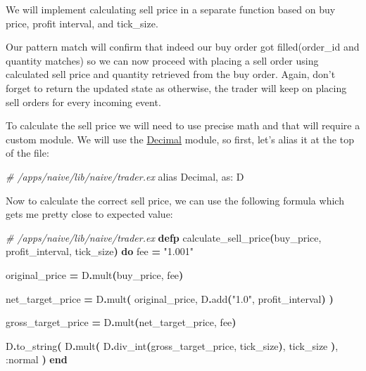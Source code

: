 \documentclass[
  oneside]{book}
\newenvironment{Shaded}{\begin{snugshade}}{\end{snugshade}}
\newcommand{\CommentTok}[1]{\textcolor[rgb]{0.56,0.35,0.01}{\textit{#1}}}
\newcommand{\ConstantTok}[1]{\textcolor[rgb]{0.56,0.35,0.01}{#1}}
\newcommand{\FunctionTok}[1]{\textcolor[rgb]{0.13,0.29,0.53}{\textbf{#1}}}
\newcommand{\ImportTok}[1]{#1}
\newcommand{\KeywordTok}[1]{\textcolor[rgb]{0.13,0.29,0.53}{\textbf{#1}}}
\newcommand{\NormalTok}[1]{#1}
\newcommand{\OperatorTok}[1]{\textcolor[rgb]{0.81,0.36,0.00}{\textbf{#1}}}
\newcommand{\StringTok}[1]{\textcolor[rgb]{0.31,0.60,0.02}{#1}}
\newcommand{\VariableTok}[1]{\textcolor[rgb]{0.00,0.00,0.00}{#1}}
\begin{document}
We will implement calculating sell price in a separate function based on buy price, profit interval, and tick\_size.

Our pattern match will confirm that indeed our buy order got filled(order\_id and quantity matches) so we can now proceed with placing a sell order using calculated sell price and quantity retrieved from the buy order.
Again, don't forget to return the updated state as otherwise, the trader will keep on placing sell orders for every incoming event.

To calculate the sell price we will need to use precise math and that will require a custom module. We will use the \href{https://github.com/ericmj/decimal}{Decimal} module, so first, let's alias it at the top of the file:

\begin{Shaded}
\begin{Highlighting}[]
\CommentTok{\# /apps/naive/lib/naive/trader.ex}
\ImportTok{alias} \ConstantTok{Decimal}\NormalTok{, }\VariableTok{as:}\NormalTok{ D}
\end{Highlighting}
\end{Shaded}

Now to calculate the correct sell price, we can use the following formula which gets me pretty close to expected value:

\begin{Shaded}
\begin{Highlighting}[]
  \CommentTok{\# /apps/naive/lib/naive/trader.ex}
  \KeywordTok{defp}\NormalTok{ calculate\_sell\_price}\FunctionTok{(}\NormalTok{buy\_price, profit\_interval, tick\_size}\FunctionTok{)} \KeywordTok{do}
\NormalTok{    fee }\OperatorTok{=} \StringTok{"1.001"}

\NormalTok{    original\_price }\OperatorTok{=}\NormalTok{ D}\OperatorTok{.}\NormalTok{mult}\FunctionTok{(}\NormalTok{buy\_price, fee}\FunctionTok{)}

\NormalTok{    net\_target\_price }\OperatorTok{=}
\NormalTok{      D}\OperatorTok{.}\NormalTok{mult}\FunctionTok{(}
\NormalTok{        original\_price,}
\NormalTok{        D}\OperatorTok{.}\NormalTok{add}\FunctionTok{(}\StringTok{"1.0"}\NormalTok{, profit\_interval}\FunctionTok{)}
      \FunctionTok{)}

\NormalTok{    gross\_target\_price }\OperatorTok{=}\NormalTok{ D}\OperatorTok{.}\NormalTok{mult}\FunctionTok{(}\NormalTok{net\_target\_price, fee}\FunctionTok{)}

\NormalTok{    D}\OperatorTok{.}\NormalTok{to\_string}\FunctionTok{(}
\NormalTok{      D}\OperatorTok{.}\NormalTok{mult}\FunctionTok{(}
\NormalTok{        D}\OperatorTok{.}\NormalTok{div\_int}\FunctionTok{(}\NormalTok{gross\_target\_price, tick\_size}\FunctionTok{)}\NormalTok{,}
\NormalTok{        tick\_size}
      \FunctionTok{)}\NormalTok{,}
      \VariableTok{:normal}
    \FunctionTok{)}
  \KeywordTok{end}
\end{Highlighting}
\end{Shaded}
\end{document}
